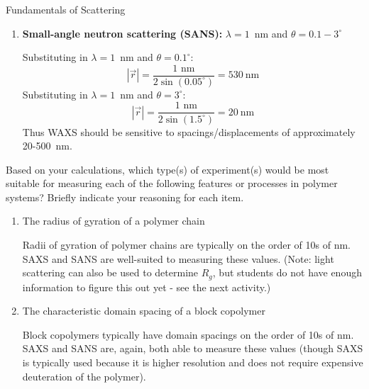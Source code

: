 \begin{activity}{Fundamentals of Scattering}
\begin{ctqs}
\begin{enumerate}
		\item \textbf{Small-angle neutron scattering (SANS):} $\lambda = 1$~nm and $\theta = 0.1-3^\circ$
		
			\begin{solution}[2.5in]{}
				Substituting in $\lambda = 1$~nm and $\theta=0.1^\circ$:
				\begin{equation*}
					|\vec r| = \frac{1\text{ nm}}{2\sin(0.05^\circ)} = 530~\text{nm}
				\end{equation*}
				Substituting in $\lambda = 1$~nm and $\theta=3^\circ$:
				\begin{equation*}
					|\vec r| = \frac{1\text{ nm}}{2\sin(1.5^\circ)} = 20~\text{nm}
				\end{equation*}
				Thus WAXS should be sensitive to spacings/displacements of approximately 20-500~nm.
			\end{solution}
		
	\end{enumerate}

	\question Based on your calculations, which type(s) of experiment(s) would be most suitable for measuring each of the following features or processes in polymer systems?  Briefly indicate your reasoning for each item. \label{\labelbase:ctq:exptchoices}
	
		\begin{enumerate}
		
			\item The radius of gyration of a polymer chain
			
				\begin{solution}[0.75in]{}
					Radii of gyration of polymer chains are typically on the order of 10s of nm.  SAXS and SANS are well-suited to measuring these values.  (Note: light scattering can also be used to determine $R_g$, but students do not have enough information to figure this out yet - see the next activity.)
				\end{solution}
			
			\item The characteristic domain spacing of a block copolymer
			
				\begin{solution}[0.75in]{}
					Block copolymers typically have domain spacings on the order of 10s of nm.  SAXS and SANS are, again, both able to measure these values (though SAXS is typically used because it is higher resolution and does not require expensive deuteration of the polymer).
				\end{solution}
				

\end{enumerate}
\end{ctqs}
\end{activity}
